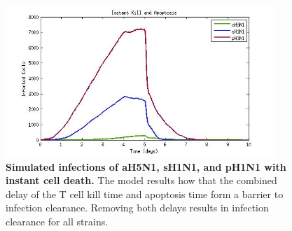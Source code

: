 \documentclass[preprint,10pt,authoryear]{elsarticle}
\begin{document}
\begin{figure}[!ht]
\begin{center}
\includegraphics[width=4in]{Figure_7}
 \end{center}
\caption{{\bf Simulated infections of aH5N1, sH1N1, and pH1N1 with instant cell death.} The model results how that the combined delay of the T cell kill time and apoptosis time form a barrier to infection clearance.  Removing both delays results in infection clearance for all strains.}
 \label{fig:instantkill}
\end{figure}
\end{document}
